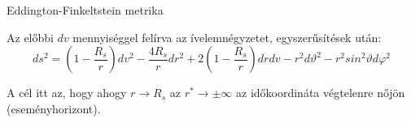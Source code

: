 \documentclass[10pt]{beamer}
\begin{document}
\begin{frame}[t]{Eddington-Finkeltstein metrika}
\par Az előbbi $dv$ mennyiséggel felírva az ívelemnégyzetet, egyszerűsítések után:
$$ds^{2} = (1-\frac{R_{s}}{r})dv^{2} - \frac{4R_{s}}{r}dr^{2} + 2(1-\frac{R_{s}}{r})drdv - r^{2}d\vartheta^{2} - r^{2}sin^{2}\vartheta d\varphi^{2}$$
\par A cél itt az, hogy ahogy $r \rightarrow R_{s}$ az $r^{*} \rightarrow \pm \infty$ az időkoordináta végtelenre nőjön (eseményhorizont).
\end{frame}
\end{document}
